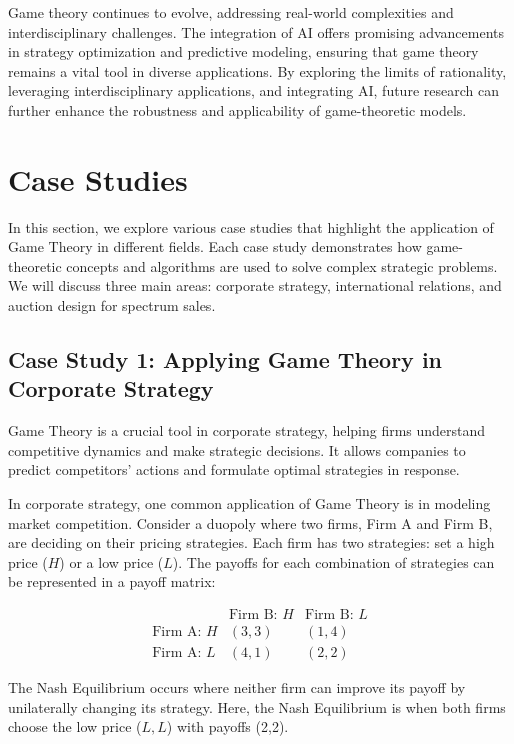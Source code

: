 \documentclass[12pt]{book} %
\begin{document}
Game theory continues to evolve, addressing real-world complexities and interdisciplinary challenges. The integration of AI offers promising advancements in strategy optimization and predictive modeling, ensuring that game theory remains a vital tool in diverse applications. By exploring the limits of rationality, leveraging interdisciplinary applications, and integrating AI, future research can further enhance the robustness and applicability of game-theoretic models.


\section{Case Studies}
In this section, we explore various case studies that highlight the application of Game Theory in different fields. Each case study demonstrates how game-theoretic concepts and algorithms are used to solve complex strategic problems. We will discuss three main areas: corporate strategy, international relations, and auction design for spectrum sales.

\subsection{Case Study 1: Applying Game Theory in Corporate Strategy}
Game Theory is a crucial tool in corporate strategy, helping firms understand competitive dynamics and make strategic decisions. It allows companies to predict competitors' actions and formulate optimal strategies in response.

In corporate strategy, one common application of Game Theory is in modeling market competition. Consider a duopoly where two firms, Firm A and Firm B, are deciding on their pricing strategies. Each firm has two strategies: set a high price ($H$) or a low price ($L$). The payoffs for each combination of strategies can be represented in a payoff matrix:

\begin{equation}
\begin{array}{c|cc}
 & \text{Firm B: } H & \text{Firm B: } L \\
\hline
\text{Firm A: } H & (3,3) & (1,4) \\
\text{Firm A: } L & (4,1) & (2,2)
\end{array}
\end{equation}

The Nash Equilibrium occurs where neither firm can improve its payoff by unilaterally changing its strategy. Here, the Nash Equilibrium is when both firms choose the low price ($L, L$) with payoffs (2,2).
\end{document}
